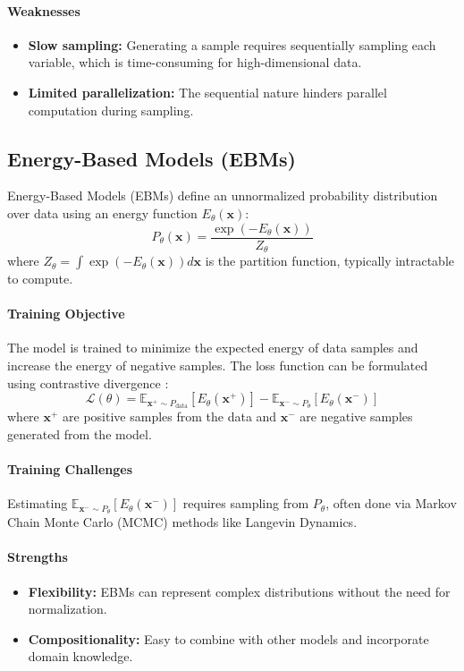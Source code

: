 \paragraph{Weaknesses}
\begin{itemize}
    \item \textbf{Slow sampling:} Generating a sample requires sequentially sampling each variable, which is time-consuming for high-dimensional data.
    \item \textbf{Limited parallelization:} The sequential nature hinders parallel computation during sampling.
\end{itemize}

\subsection{Energy-Based Models (EBMs)}
Energy-Based Models (EBMs) \cite{lecun2006tutorial} define an unnormalized probability distribution over data using an energy function \( E_{\theta}(\mathbf{x}) \):
\[
P_{\theta}(\mathbf{x}) = \frac{\exp(-E_{\theta}(\mathbf{x}))}{Z_{\theta}}
\]
where \( Z_{\theta} = \int \exp(-E_{\theta}(\mathbf{x})) d\mathbf{x} \) is the partition function, typically intractable to compute.

\paragraph{Training Objective}
The model is trained to minimize the expected energy of data samples and increase the energy of negative samples. The loss function can be formulated using contrastive divergence \cite{hinton2002training}:
\[
\mathcal{L}(\theta) = \mathbb{E}_{\mathbf{x}^+ \sim P_{\text{data}}} [E_{\theta}(\mathbf{x}^+)] - \mathbb{E}_{\mathbf{x}^- \sim P_{\theta}} [E_{\theta}(\mathbf{x}^-)]
\]
where \( \mathbf{x}^+ \) are positive samples from the data and \( \mathbf{x}^- \) are negative samples generated from the model.

\paragraph{Training Challenges}
Estimating \( \mathbb{E}_{\mathbf{x}^- \sim P_{\theta}} [E_{\theta}(\mathbf{x}^-)] \) requires sampling from \( P_{\theta} \), often done via Markov Chain Monte Carlo (MCMC) methods like Langevin Dynamics.

\paragraph{Strengths}
\begin{itemize}
    \item \textbf{Flexibility:} EBMs can represent complex distributions without the need for normalization.
    \item \textbf{Compositionality:} Easy to combine with other models and incorporate domain knowledge.
\end{itemize}

